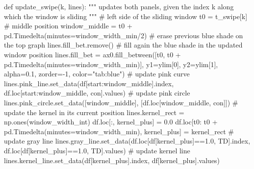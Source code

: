 \documentclass[
  letterpaper,
  DIV=11,
  numbers=noendperiod,
  oneside]{scrreprt}
\newenvironment{Shaded}{\begin{snugshade}}{\end{snugshade}}
\newcommand{\CommentTok}[1]{\textcolor[rgb]{0.37,0.37,0.37}{#1}}
\newcommand{\DecValTok}[1]{\textcolor[rgb]{0.68,0.00,0.00}{#1}}
\newcommand{\FloatTok}[1]{\textcolor[rgb]{0.68,0.00,0.00}{#1}}
\newcommand{\KeywordTok}[1]{\textcolor[rgb]{0.00,0.23,0.31}{#1}}
\newcommand{\NormalTok}[1]{\textcolor[rgb]{0.00,0.23,0.31}{#1}}
\newcommand{\OperatorTok}[1]{\textcolor[rgb]{0.37,0.37,0.37}{#1}}
\newcommand{\StringTok}[1]{\textcolor[rgb]{0.13,0.47,0.30}{#1}}
\begin{document}
\begin{Shaded}
\begin{Highlighting}[]
\KeywordTok{def}\NormalTok{ update\_swipe(k, lines):}
    \CommentTok{"""}
\CommentTok{    updates both panels, given the index k along which the window is sliding}
\CommentTok{    """}
    \CommentTok{\# left side of the sliding window}
\NormalTok{    t0 }\OperatorTok{=}\NormalTok{ t\_swipe[k]}
    \CommentTok{\# middle position}
\NormalTok{    window\_middle }\OperatorTok{=}\NormalTok{ t0 }\OperatorTok{+}\NormalTok{ pd.Timedelta(minutes}\OperatorTok{=}\NormalTok{window\_width\_min}\OperatorTok{/}\DecValTok{2}\NormalTok{)}
    \CommentTok{\# erase previous blue shade on the top graph}
\NormalTok{    lines.fill\_bet.remove()}
    \CommentTok{\# fill again the blue shade in the updated window position}
\NormalTok{    lines.fill\_bet }\OperatorTok{=}\NormalTok{ ax0.fill\_between([t0, t0 }\OperatorTok{+}\NormalTok{ pd.Timedelta(minutes}\OperatorTok{=}\NormalTok{window\_width\_min)],}
\NormalTok{                                               y1}\OperatorTok{=}\NormalTok{ylim[}\DecValTok{0}\NormalTok{], y2}\OperatorTok{=}\NormalTok{ylim[}\DecValTok{1}\NormalTok{], alpha}\OperatorTok{=}\FloatTok{0.1}\NormalTok{, zorder}\OperatorTok{={-}}\DecValTok{1}\NormalTok{, color}\OperatorTok{=}\StringTok{"tab:blue"}\NormalTok{)}
    \CommentTok{\# update pink curve}
\NormalTok{    lines.pink\_line.set\_data(df[start:window\_middle].index,}
\NormalTok{                             df.loc[start:window\_middle, }\StringTok{\textquotesingle{}con\textquotesingle{}}\NormalTok{].values)}
    \CommentTok{\# update pink circle}
\NormalTok{    lines.pink\_circle.set\_data([window\_middle], [df.loc[window\_middle, }\StringTok{\textquotesingle{}con\textquotesingle{}}\NormalTok{]])}
    \CommentTok{\# update the kernel in its current position}
\NormalTok{    lines.kernel\_rect }\OperatorTok{=}\NormalTok{ np.ones(window\_width\_int)}
\NormalTok{    df.loc[:, }\StringTok{\textquotesingle{}kernel\_plus\textquotesingle{}}\NormalTok{] }\OperatorTok{=} \FloatTok{0.0}
\NormalTok{    df.loc[t0: t0 }\OperatorTok{+}\NormalTok{ pd.Timedelta(minutes}\OperatorTok{=}\NormalTok{window\_width\_min), }\StringTok{\textquotesingle{}kernel\_plus\textquotesingle{}}\NormalTok{] }\OperatorTok{=}\NormalTok{ kernel\_rect}
    \CommentTok{\# update gray line}
\NormalTok{    lines.gray\_line.set\_data(df.loc[df[}\StringTok{\textquotesingle{}kernel\_plus\textquotesingle{}}\NormalTok{]}\OperatorTok{==}\FloatTok{1.0}\NormalTok{, }\StringTok{\textquotesingle{}TD\textquotesingle{}}\NormalTok{].index,}
\NormalTok{                             df.loc[df[}\StringTok{\textquotesingle{}kernel\_plus\textquotesingle{}}\NormalTok{]}\OperatorTok{==}\FloatTok{1.0}\NormalTok{, }\StringTok{\textquotesingle{}TD\textquotesingle{}}\NormalTok{].values)}
    \CommentTok{\# update kernel line}
\NormalTok{    lines.kernel\_line.set\_data(df[}\StringTok{\textquotesingle{}kernel\_plus\textquotesingle{}}\NormalTok{].index, df[}\StringTok{\textquotesingle{}kernel\_plus\textquotesingle{}}\NormalTok{].values)}


\end{Highlighting}
\end{Shaded}
\end{document}
